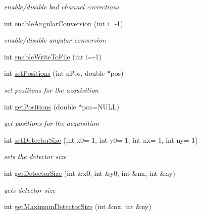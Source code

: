 \begin{CompactItemize}
\begin{CompactList}\small\item\em enable/disable bad channel corrections \item\end{CompactList}\item 
int \hyperlink{classslsDetectorUsers_51f92b69e05e8ee2e0c547ec4a6e97da}{enable\-Angular\-Conversion} (int i=-1)
\begin{CompactList}\small\item\em enable/disable angular conversion \item\end{CompactList}\item 
int \hyperlink{classslsDetectorUsers_6d54a79ae4cfdb808f5db9969537efd3}{enable\-Write\-To\-File} (int i=-1)
\item 
int \hyperlink{classslsDetectorUsers_f296c05ee6134fb8d53d08a025e89775}{set\-Positions} (int n\-Pos, double $\ast$pos)
\begin{CompactList}\small\item\em set positions for the acquisition \item\end{CompactList}\item 
int \hyperlink{classslsDetectorUsers_e6e5f06995e3ef110824adc5f8b095e9}{get\-Positions} (double $\ast$pos=NULL)
\begin{CompactList}\small\item\em get positions for the acquisition \item\end{CompactList}\item 
int \hyperlink{classslsDetectorUsers_42c97d03516a2457f8e9a98a16a9a43d}{set\-Detector\-Size} (int x0=-1, int y0=-1, int nx=-1, int ny=-1)
\begin{CompactList}\small\item\em sets the detector size \item\end{CompactList}\item 
int \hyperlink{classslsDetectorUsers_7f4fb3cefff5f0175cd2e4fd57ee1be4}{get\-Detector\-Size} (int \&x0, int \&y0, int \&nx, int \&ny)
\begin{CompactList}\small\item\em gets detector size \item\end{CompactList}\item 
int \hyperlink{classslsDetectorUsers_588a5e1d231cd6778f6f78fdc53b9681}{get\-Maximum\-Detector\-Size} (int \&nx, int \&ny)

\end{CompactItemize}
